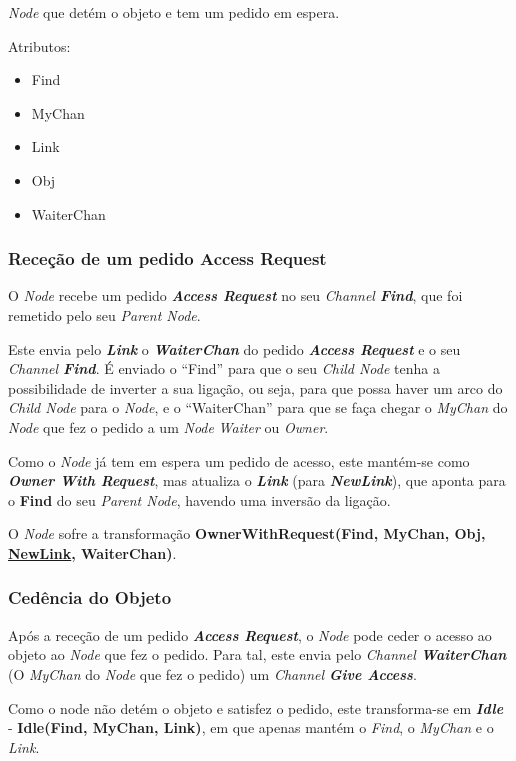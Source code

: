 \emph{Node} que detém o objeto e tem um pedido em espera.

Atributos:
\begin{itemize}
    \item Find
    \item MyChan
    \item Link
    \item Obj
    \item WaiterChan
\end{itemize}

\subsubsection*{Receção de um pedido Access Request}
O \emph{Node} recebe um pedido \emph{\textbf{Access Request}} no seu \emph{Channel \textbf{Find}},
que foi remetido pelo seu \emph{Parent Node}.

Este envia pelo \textbf{\emph{Link}} o \textbf{\emph{WaiterChan}} do pedido \emph{\textbf{Access Request}} e o seu \emph{Channel \textbf{Find}}.
É enviado o ``Find'' para que o seu \emph{Child Node} tenha a possibilidade de inverter a sua ligação, ou seja, para que possa haver um arco do \emph{Child Node} para o \emph{Node}, 
e o ``WaiterChan'' para que se faça chegar o \emph{MyChan} do \emph{Node} que fez o pedido a um \emph{Node} \emph{Waiter} ou \emph{Owner}.

Como o \emph{Node} já tem em espera um pedido de acesso, este mantém-se como \emph{\textbf{Owner With Request}},
mas atualiza o \textbf{\emph{Link}} (para \textbf{\emph{NewLink}}),
que aponta para o \textbf{Find} do seu \emph{Parent Node}, havendo uma inversão da ligação.

O \emph{Node} sofre a transformação \textbf{OwnerWithRequest(Find, MyChan, Obj, \underline{NewLink}, WaiterChan)}.


\subsubsection*{Cedência do Objeto}
Após a receção de um pedido \emph{\textbf{Access Request}}, o \emph{Node} pode ceder o acesso ao objeto ao \emph{Node} que fez o pedido.
Para tal, este envia pelo \emph{Channel \textbf{WaiterChan}} (O \emph{MyChan} do \emph{Node} que fez o pedido) um \emph{Channel \textbf{Give Access}}.

Como o node não detém o objeto e satisfez o pedido, este transforma-se em \emph{\textbf{Idle}} - \textbf{Idle(Find, MyChan, Link)}, em que apenas
mantém o \emph{Find}, o \emph{MyChan} e o \emph{Link}.





